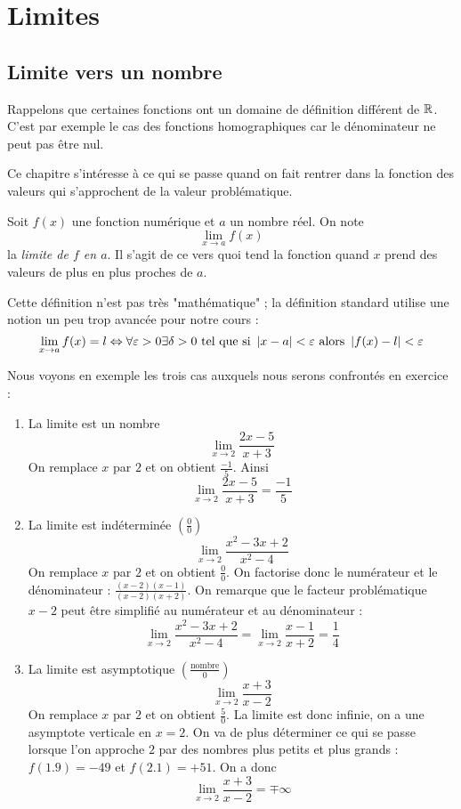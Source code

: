 \chapter{Limites}

\section{Limite vers un nombre}

Rappelons que certaines fonctions ont un domaine de définition différent de $\mathbb{R}$. C'est par exemple le cas des fonctions homographiques car le dénominateur ne peut pas être nul.

Ce chapitre s'intéresse à ce qui se passe quand on fait  rentrer dans la fonction des valeurs qui s'approchent de la valeur problématique.

\begin{definition}
Soit $f(x)$ une fonction numérique et $a$ un nombre réel. On note
$$
\lim_{x\rightarrow a} f(x)
$$
la \emph{limite de $f$ en $a$}. Il s'agit de ce vers quoi tend la fonction quand $x$ prend des valeurs de plus en plus proches de $a$.
\end{definition}

Cette définition n'est pas très "mathématique" ; la définition standard utilise une notion un peu trop avancée pour notre cours :
$$
\lim_{x\rightarrow a} f(x) = l \Leftrightarrow \forall \varepsilon >0 \exists \delta >0 \mbox{ tel que si }  \left|x-a\right|< \varepsilon \mbox{ alors } \left|f(x) - l\right|<\varepsilon
$$

\begin{exemple}
Nous voyons en exemple les trois cas auxquels nous serons confrontés en exercice :
\begin{enumerate}
\item La limite est un nombre
$$
\lim_{x\rightarrow 2} \frac{2x-5}{x+3}
$$
On remplace $x$ par $2$ et on obtient $\frac{-1}{5}$. Ainsi 
$$
\lim_{x\rightarrow 2} \frac{2x-5}{x+3} = \frac{-1}{5}
$$
\item La limite est indéterminée $\left( \frac{0}{0}\right)$
$$
\lim_{x\rightarrow 2} \frac{x^2 - 3 x + 2}{x^2-4}
$$
On remplace $x$ par $2$ et on obtient $\frac{0}{0}$. On factorise donc le numérateur et le dénominateur :
$\frac{(x-2)(x-1)}{(x-2)(x+2)}$. On remarque que le facteur problématique $x-2$ peut être simplifié au numérateur et au dénominateur :
$$
\lim_{x\rightarrow 2} \frac{x^2 - 3 x + 2}{x^2-4} = \lim_{x\rightarrow 2}\frac{x-1}{x+2} = \frac{1}{4}
$$
\item La limite est asymptotique $\left( \frac{\mbox{nombre}}{0}\right)$
$$
\lim_{x\rightarrow 2}\frac{x+3}{x-2}
$$
On remplace $x$ par $2$ et on obtient $\frac{5}{0}$. La limite est donc infinie, on a une asymptote verticale en $x=2$. On va de plus déterminer ce qui se passe lorsque l'on approche $2$ par des nombres plus petits et plus grands : $f(1.9) = -49$ et $f(2.1) = +51$. On a donc
$$
\lim_{x\rightarrow 2}\frac{x+3}{x-2} = \mp \infty
$$
\end{enumerate}
\end{exemple}

